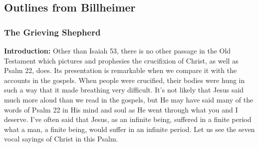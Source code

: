 \subsection{Outlines from Billheimer}

\subsubsection{The Grieving Shepherd}

\textbf{Introduction: } Other than Isaiah 53, there is no other passage in the Old Testament which pictures and prophesies the crucifixion of Christ, as well as Psalm 22, does.  Its presentation is remarkable when we compare it with the accounts in the gospels.  When people were crucified, their bodies were hung in such a way that it made breathing very difficult.  It’s not likely that Jesus said much more aloud than we read in the gospels, but He may have said many of the words of Psalm 22 in His mind and soul as He went through what you and I deserve.  I’ve often said that Jesus, as an infinite being, suffered in a finite period what a man, a finite being, would suffer in an infinite period.  Let us see the seven vocal sayings of Christ in this Psalm.\\


